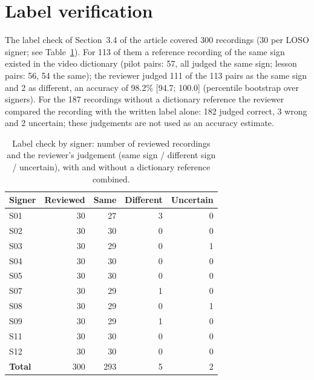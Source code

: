 \documentclass[a4paper,10pt]{article}
\begin{document}
\section{Label verification}
The label check of Section~3.4 of the article covered 300 recordings (30 per LOSO signer; see Table~\ref{tab:s_lab}). For 113 of them a reference recording of the same sign existed in the video dictionary (pilot pairs: 57, all judged the same sign; lesson pairs: 56, 54 the same); the reviewer judged 111 of the 113 pairs as the same sign and 2 as different, an accuracy of 98.2\% [94.7; 100.0] (percentile bootstrap over signers). For the 187 recordings without a dictionary reference the reviewer compared the recording with the written label alone: 182 judged correct, 3 wrong and 2 uncertain; these judgements are not used as an accuracy estimate.
\begin{table}[H]
\caption{Label check by signer: number of reviewed recordings and the reviewer's judgement (same sign / different sign / uncertain), with and without a dictionary reference combined.}\label{tab:s_lab}
\centering
\footnotesize
\begin{tabular}{lrrrr}
\toprule
\textbf{Signer} & \textbf{Reviewed} & \textbf{Same} & \textbf{Different} & \textbf{Uncertain} \\
\midrule
S01 & 30 & 27 & 3 & 0 \\
S02 & 30 & 30 & 0 & 0 \\
S03 & 30 & 29 & 0 & 1 \\
S04 & 30 & 30 & 0 & 0 \\
S05 & 30 & 30 & 0 & 0 \\
S07 & 30 & 29 & 1 & 0 \\
S08 & 30 & 29 & 0 & 1 \\
S09 & 30 & 29 & 1 & 0 \\
S11 & 30 & 30 & 0 & 0 \\
S12 & 30 & 30 & 0 & 0 \\
\textbf{Total} & 300 & 293 & 5 & 2 \\
\bottomrule
\end{tabular}
\end{table}
\end{document}
